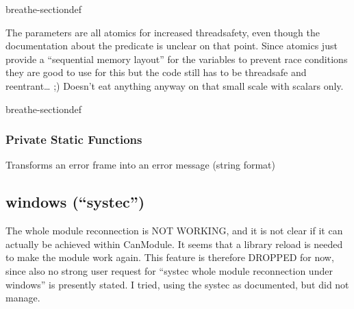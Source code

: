 \documentclass[a4paper,10pt,english]{sphinxmanual}
\begin{document}
\begin{fulllineitems}
\begin{sphinxuseclass}{breathe-sectiondef}
\begin{fulllineitems}
\sphinxAtStartPar
The parameters are all atomics for increased thread\sphinxhyphen{}safety, even though the documentation about the predicate is unclear on that point. Since atomics just provide a “sequential memory layout” for the variables to prevent race conditions they are good to use for this but the code still has to be threadsafe and reentrant… ;\sphinxhyphen{}) Doesn’t eat anything anyway on that small scale with scalars only.

\sphinxAtStartPar
{} 

\end{fulllineitems}


\end{sphinxuseclass}
\begin{sphinxuseclass}{breathe-sectiondef}\subsubsection*{Private Static Functions}


\begin{fulllineitems}
%
\pysigstartmultiline
{}%
\pysigstopmultiline
\sphinxAtStartPar
Transforms an error frame into an error message (string format) 

\end{fulllineitems}


\end{sphinxuseclass}
\end{fulllineitems}



\subsection{windows (“systec”)}
\label{\detokenize{reconnection:windows-systec}}
\sphinxAtStartPar
The whole module reconnection is NOT WORKING, and it is not clear if it can actually
be achieved within CanModule. It seems that a library reload is needed to make the module work again.
This feature is therefore DROPPED for now, since also no strong user request for “systec whole module reconnection
under windows” is presently stated. I tried, using the systec  as documented, but did not manage.
\end{document}
